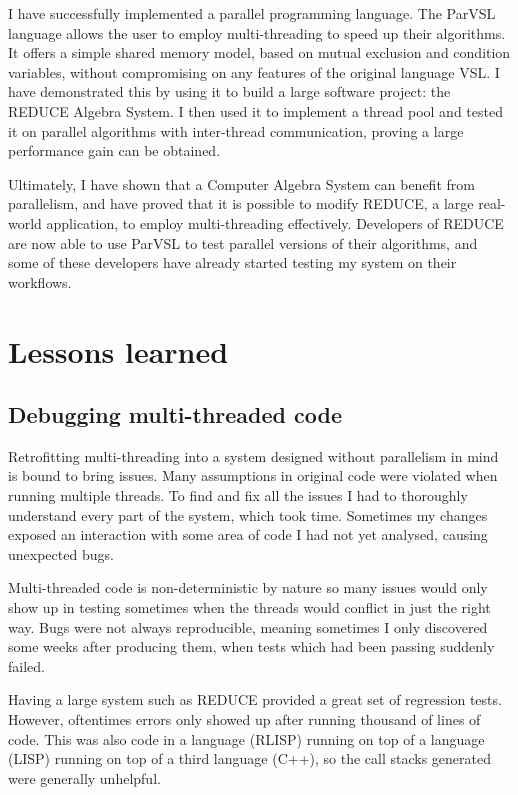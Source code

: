 I have successfully implemented a parallel programming language. The ParVSL language
allows the user to employ multi-threading to speed up their algorithms. It offers
a simple shared memory model, based on mutual exclusion and condition variables,
without compromising on any features of the original language VSL. I have demonstrated
this by using it to build a large software project: the REDUCE Algebra System.
I then used it to implement a thread pool and tested it on parallel algorithms with
inter-thread communication, proving a large performance gain can be obtained.

Ultimately, I have shown that a Computer Algebra System can benefit from parallelism,
and have proved that it is possible to modify REDUCE, a large real-world application,
to employ multi-threading effectively. Developers of REDUCE are now able to
use ParVSL to test parallel versions of their algorithms, and some of these developers
have already started testing my system on their workflows.

\section{Lessons learned}

\subsection{Debugging multi-threaded code}

Retrofitting multi-threading into a system designed without parallelism in mind is bound to bring issues.
Many assumptions in original code were violated when running multiple threads. To find and fix all the issues
I had to thoroughly understand every part of the system, which took time.
Sometimes my changes exposed an interaction with some area of code
I had not yet analysed, causing unexpected bugs.

Multi-threaded code is non-deterministic
by nature so many issues would only show up in testing sometimes
when the threads would conflict in just the
right way. Bugs were not always reproducible,
meaning sometimes I only discovered some weeks after producing them,
when tests which had been passing suddenly failed.

Having a large system such as REDUCE provided a great set of regression
tests. However, oftentimes errors only showed up after running thousand of lines
of code. This was also code in a language (RLISP) running on top
of a language (LISP) running on top of a third language (C++), so the call stacks
generated were generally unhelpful.


